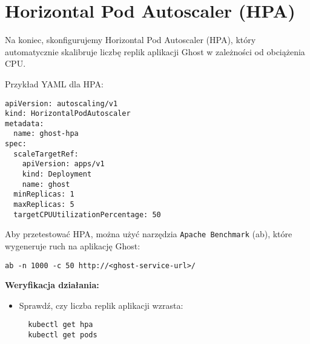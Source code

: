 \documentclass{article}
\begin{document}
\section{Horizontal Pod Autoscaler (HPA)}

Na koniec, skonfigurujemy Horizontal Pod Autoscaler (HPA), który automatycznie skalibruje liczbę replik aplikacji Ghost w zależności od obciążenia CPU.

Przykład YAML dla HPA:
\begin{lstlisting}
apiVersion: autoscaling/v1
kind: HorizontalPodAutoscaler
metadata:
  name: ghost-hpa
spec:
  scaleTargetRef:
    apiVersion: apps/v1
    kind: Deployment
    name: ghost
  minReplicas: 1
  maxReplicas: 5
  targetCPUUtilizationPercentage: 50
\end{lstlisting}

Aby przetestować HPA, można użyć narzędzia \texttt{Apache Benchmark} (ab), które wygeneruje ruch na aplikację Ghost:
\begin{lstlisting}
ab -n 1000 -c 50 http://<ghost-service-url>/
\end{lstlisting}

\textbf{Weryfikacja działania:}
\begin{itemize}
  \item Sprawdź, czy liczba replik aplikacji wzrasta:
  \begin{lstlisting}
  kubectl get hpa
  kubectl get pods
  \end{lstlisting}
\end{itemize}
\end{document}
